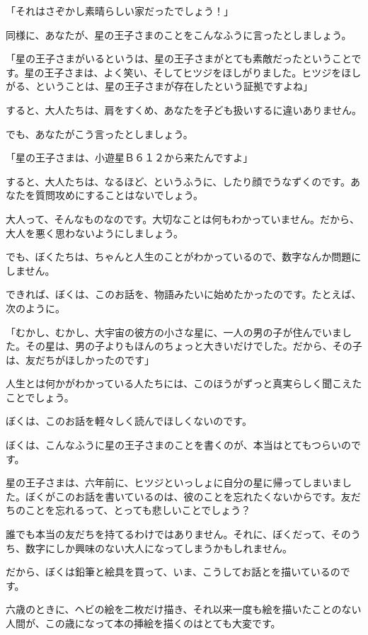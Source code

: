 「それはさぞかし素晴らしい家だったでしょう！」

同様に、あなたが、星の王子さまのことをこんなふうに言ったとしましょう。

「星の王子さまがいるというは、星の王子さまがとても素敵だったということです。星の王子さまは、よく笑い、そしてヒツジをほしがりました。ヒツジをほしがる、ということは、星の王子さまが存在したという証拠ですよね」

すると、大人たちは、肩をすくめ、あなたを子ども扱いするに違いありません。

でも、あなたがこう言ったとしましょう。

「星の王子さまは、小遊星Ｂ６１２から来たんですよ」

すると、大人たちは、なるほど、というふうに、したり顔でうなずくのです。あなたを質問攻めにすることはないでしょう。

大人って、そんなものなのです。大切なことは何もわかっていません。だから、大人を悪く思わないようにしましょう。

でも、ぼくたちは、ちゃんと人生のことがわかっているので、数字なんか問題にしません。

できれば、ぼくは、このお話を、物語みたいに始めたかったのです。たとえば、次のように。


「むかし、むかし、大宇宙の彼方の小さな星に、一人の男の子が住んでいました。その星は、男の子よりもほんのちょっと大きいだけでした。だから、その子は、友だちがほしかったのです」

人生とは何かがわかっている人たちには、このほうがずっと真実らしく聞こえたことでしょう。

ぼくは、このお話を軽々しく読んでほしくないのです。

ぼくは、こんなふうに星の王子さまのことを書くのが、本当はとてもつらいのです。

星の王子さまは、六年前に、ヒツジといっしょに自分の星に帰ってしまいました。ぼくがこのお話を書いているのは、彼のことを忘れたくないからです。友だちのことを忘れるって、とっても悲しいことでしょう？

誰でも本当の友だちを持てるわけではありません。それに、ぼくだって、そのうち、数字にしか興味のない大人になってしまうかもしれません。

だから、ぼくは鉛筆と絵具を買って、いま、こうしてお話とを描いているのです。

六歳のときに、ヘビの絵を二枚だけ描き、それ以来一度も絵を描いたことのない人間が、この歳になって本の挿絵を描くのはとても大変です。

